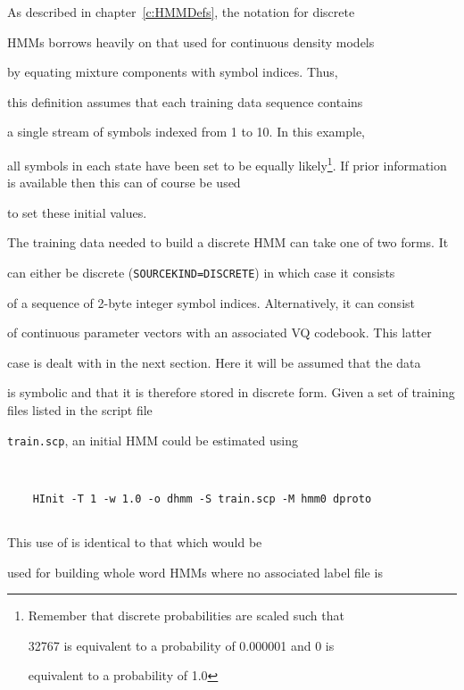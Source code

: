 As described in chapter~\ref{c:HMMDefs}, the notation for discrete


HMMs borrows heavily on that used for continuous density models


by equating mixture components with symbol indices.  Thus,


this definition assumes that each training data sequence contains


a single stream of symbols indexed from 1 to 10.  In this example,


all symbols in each state have been set to be equally likely\footnote{


Remember that discrete probabilities are scaled such that


32767 is equivalent to a probability of 0.000001 and 0 is 


equivalent to a probability of 1.0


}.  If prior information is available then this can of course be used


to set these initial values.





The training data needed to build a discrete HMM can take one of two forms. It


can either be discrete (\texttt{SOURCEKIND=DISCRETE}) in which case it consists


of a sequence of 2-byte integer symbol indices.  Alternatively, it can consist


of continuous parameter vectors with an associated VQ codebook.  This latter


case is dealt with in the next section.  Here it will be assumed that the data


is symbolic and that it is therefore stored in discrete form. Given a set of training files listed in the script file


\texttt{train.scp}, an initial HMM could be estimated using


\begin{verbatim}


    HInit -T 1 -w 1.0 -o dhmm -S train.scp -M hmm0 dproto


\end{verbatim}


This use of  is identical to that which would be


used for building whole word HMMs where no associated label file is


